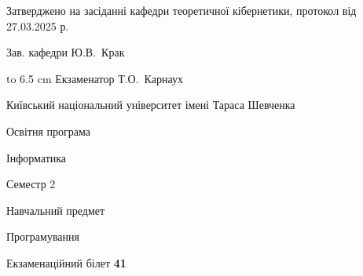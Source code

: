 \documentclass[12pt, ukrainian]{article}
\begin{document}
{\smallskip\smallskip \begin {scriptsize} Затверджено на засіданні кафедри теоретичної кібернетики, протокол   від   27.03.2025 р.\par\smallskip\smallskip\smallskip\smallskip
{\parbox {6.5 cm} {Зав. кафедри \dotfill Ю.В.~Крак}}\hspace {0.7cm} {\hbox to 6.5 cm { Екзаменатор \dotfill Т.О.~Карнаух}} \end{scriptsize}}
\newpage
{{\begin {scriptsize}\par
{ \center  Київський національний університет імені Тараса Шевченка \par}
{\parbox {5 cm}{Освітня програма \hfill}{\parbox {7 cm}{Інформатика\hfill}}\parbox {6 cm}{\hfill Семестр 2}}\par
{\parbox {5 cm} {Навчальний предмет \hfill}\parbox {7 cm}{Програмування \hfill}\parbox {6cm}{\hfill}\par}\vspace{-15pt} \end{scriptsize}}{\center Екзаменаційний білет \No \textbf { 41 }\par}}
\end{document}
